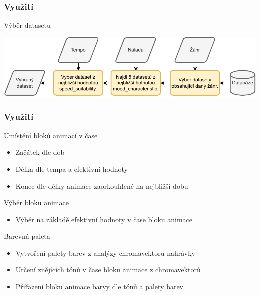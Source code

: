 \documentclass[%
  12pt,       				%
	t,                  %
	aspectratio=1610,   %
	unicode,						%
]{beamer}				    	%
\begin{document}
\begin{frame}
	\frametitle{Využití}
	\begin{block}{Výběr datasetu}
	\end{block}
	\vspace{1cm}

	\includegraphics[width = 1\columnwidth]{obrazky/Dataset_selection_diagram.pdf}

\end{frame}

\begin{frame}
	\frametitle{Využití}
	\begin{block}{Umístění bloků animací v čase}
		\begin{itemize}
			\item Začátek dle dob
			\item Délka dle tempa a efektivní hodnoty
			\item Konec dle délky animace zaorkouhlené na nejbližší dobu
		\end{itemize}
	\end{block}
	\begin{block}{Výběr bloku animace}
		\begin{itemize}
			\item Výběr na základě efektivní hodnoty v čase bloku animace
		\end{itemize}
	\end{block}

	\begin{block}{Barevná paleta}
		\begin{itemize}
			\item Vytvoření palety barev z analýzy chromavektorů nahrávky
			\item Určení znějících tónů v čase bloku animace z chromavektorů
			\item Přiřazení bloku animace barvy dle tónů a palety barev
		\end{itemize}
	\end{block}
\end{frame}
\end{document}
